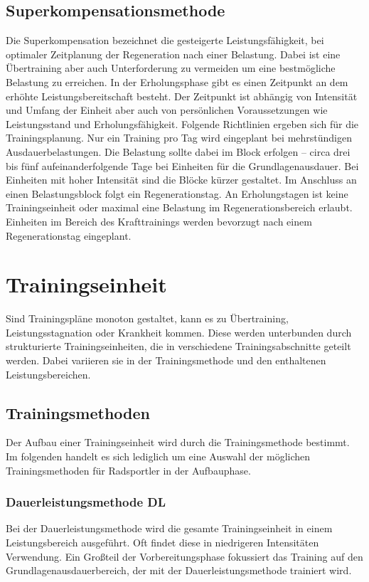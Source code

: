 \subsection{Superkompensationsmethode}
    Die Superkompensation bezeichnet die gesteigerte Leistungsfähigkeit, bei optimaler Zeitplanung der Regeneration nach einer Belastung.\cite[163]{Trainingswissenschaft} Dabei ist eine Übertraining aber auch Unterforderung zu vermeiden um eine bestmögliche Belastung zu erreichen. In der Erholungsphase gibt es einen Zeitpunkt an dem erhöhte Leistungsbereitschaft besteht. Der Zeitpunkt ist abhängig von Intensität und Umfang der Einheit aber auch von persönlichen Voraussetzungen wie Leistungsstand und Erholungsfähigkeit. \newline
    Folgende Richtlinien ergeben sich für die Trainingsplanung. \cite[44-46]{Radsporttraining} Nur ein Training pro Tag wird eingeplant bei mehrstündigen Ausdauerbelastungen. Die Belastung sollte dabei im Block erfolgen -- circa drei bis fünf aufeinanderfolgende Tage bei Einheiten für die Grundlagenausdauer. Bei Einheiten mit hoher Intensität sind die Blöcke kürzer gestaltet. Im Anschluss an einen Belastungsblock folgt ein Regenerationstag. An Erholungstagen ist keine Trainingseinheit oder maximal eine Belastung im Regenerationsbereich erlaubt. Einheiten im Bereich des Krafttrainings werden bevorzugt nach einem Regenerationstag eingeplant. 

\section{Trainingseinheit}
\label{grundlagen:einheiten}
Sind Trainingspläne monoton gestaltet, kann es zu Übertraining, Leistungsstagnation oder Krankheit kommen. Diese werden unterbunden durch strukturierte Trainingseinheiten, die in verschiedene Trainingsabschnitte geteilt werden. Dabei variieren sie in der Trainingsmethode und den enthaltenen Leistungsbereichen.
\subsection{Trainingsmethoden}
\label{grundlagen:methoden}
    Der Aufbau einer Trainingseinheit wird durch die Trainingsmethode bestimmt. Im folgenden handelt es sich lediglich um eine Auswahl der möglichen Trainingsmethoden für Radsportler in der Aufbauphase.  \cite[40-43]{Radsporttraining} 
    \subsubsection{Dauerleistungsmethode DL}
    Bei der Dauerleistungsmethode wird die gesamte Trainingseinheit in einem Leistungsbereich ausgeführt. Oft findet diese in niedrigeren Intensitäten Verwendung. Ein Großteil der Vorbereitungsphase fokussiert das Training auf den Grundlagenausdauerbereich, der mit der Dauerleistungsmethode trainiert wird.
